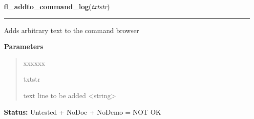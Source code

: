 \hspace{.8\funcindent}\begin{boxedminipage}{\funcwidth}

    \raggedright \textbf{fl\_addto\_command\_log}(\textit{txtstr})

    \vspace{-1.5ex}

    \rule{\textwidth}{0.5\fboxrule}
\setlength{\parskip}{2ex}
    Adds arbitrary text to the command browser

\setlength{\parskip}{1ex}
      \textbf{Parameters}
      \vspace{-1ex}

      \begin{quote}
        \begin{Ventry}{xxxxxx}

          \item[txtstr]

          text line to be added {\textless}string{\textgreater}

        \end{Ventry}

      \end{quote}

\textbf{Status:} Untested + NoDoc + NoDemo = NOT OK



    \end{boxedminipage}

    \label{xformslib:flgoodies:fl_set_command_log_position}

    \vspace{0.5ex}

